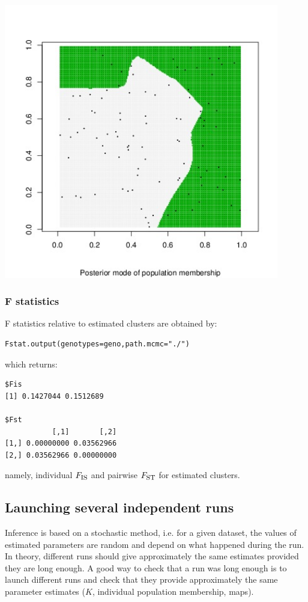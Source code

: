 \documentclass[a4paper,10pt]{article}
\newcommand{\Fst}{F_{\mbox{\footnotesize ST}}}
\newcommand{\Fis}{F_{\mbox{\footnotesize IS}}}
\begin{document}
\centerline{\includegraphics[width=12cm]{fig/map.jpeg}}


\subsubsection{F statistics}
F statistics \cite{Weir84} relative to estimated clusters are obtained by:

\begin{verbatim}
Fstat.output(genotypes=geno,path.mcmc="./")
\end{verbatim}

which returns:

\begin{verbatim}
$Fis
[1] 0.1427044 0.1512689

$Fst
           [,1]       [,2]
[1,] 0.00000000 0.03562966
[2,] 0.03562966 0.00000000
\end{verbatim}


namely, individual  $\Fis$ and pairwise $\Fst$ for estimated clusters.

\clearpage
\subsection{Launching several independent runs}

Inference is based on a stochastic method, i.e. for a given dataset, the values of estimated parameters are random and depend 
on what happened during the run. In theory, different runs should give approximately the same estimates provided they are long enough. 
A good way to check that a run was long enough is to launch different runs and check that they provide approximately the same parameter estimates 
($K$, individual population membership, maps).
\end{document}
